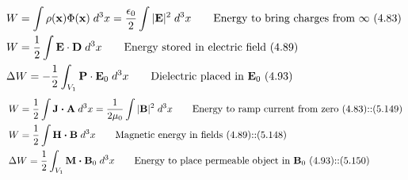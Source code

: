 \documentclass[10pt]{article}
\newcommand{\ve}[1]{\boldsymbol{\mathbf{#1}}}
\newcommand{\vect}[1]{\boldsymbol{\mathbf{#1}}}
\newcommand{\eo}{\epsilon_0}
\begin{document}
	\large
	\begin{align*}
		& W = \int \rho(\vect{x}) \Phi(\vect{x})\; d^3x = \frac{\eo}{2} \int |\ve{E}|^2 \; d^3 x\tag*{Energy to bring charges from $\infty$ (4.83)} \\	
		& W = \frac{1}{2} \int \vect{E} \cdot \vect{D} \; d^3x \tag*{Energy stored in electric field (4.89)} \\
		& \Delta W = - \frac{1}{2} \int_{V_1} \vect{P} \cdot \vect{E}_0 \; d^3 x \tag*{Dielectric placed in $\vect{E}_0$ (4.93)} \\
				\end{align*}
		\begin{align*}
		& W = \frac{1}{2} \int \vect{J \cdot A} \; d^3 x = \frac{1}{2 \mu_0} \int |\ve{B}|^2 \; d^3 x \tag*{Energy to ramp current from zero (4.83)::(5.149)} \\
		& W = \frac{1}{2} \int \vect{H \cdot B} \; d^3 x \tag*{Magnetic energy in fields (4.89)::(5.148)} \\
		& \Delta W = \frac{1}{2} \int_{V_1} \vect{M \cdot B}_0 \; d^3 x \tag*{Energy to place permeable object in $\ve{B}_0$ (4.93)::(5.150)} \\\
	\end{align*}

 
\end{document}
